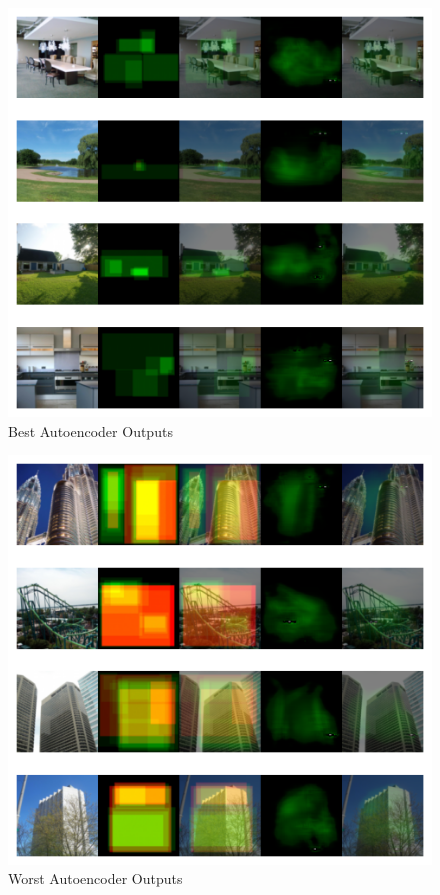 \documentclass{UoYCSproject}
\begin{document}
\begin{figure}[h]
    \centering
    \includegraphics[width=\linewidth]{Best autoencoder Outputs}
    \caption{Best Autoencoder Outputs}
    \label{fig:autoencoderBestOutput}
\end{figure}

\begin{figure}[h]
    \centering
    \includegraphics[width=\linewidth]{Worst autoencoder Outputs}
    \caption{Worst Autoencoder Outputs}
    \label{fig:autoencoderWorstOutput}
\end{figure}
\end{document}
